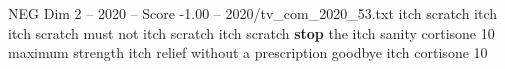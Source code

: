 \begin{textsample}{NEG Dim 2 – 2020 – Score -1.00 – 2020/tv\_com\_2020\_53.txt}  \label{ex:f2_neg_035}
itch scratch itch itch scratch must not itch scratch itch scratch \textbf{stop} the itch sanity cortisone 10 maximum strength itch relief without a prescription goodbye itch cortisone 10

\end{textsample}
